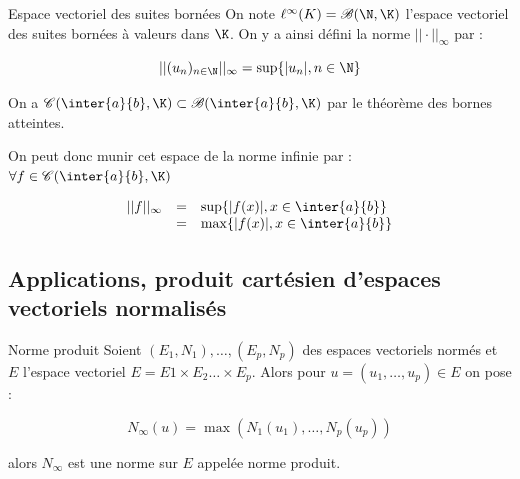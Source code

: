 \begin{definition}{Espace vectoriel des suites bornées}{}
    On note $\ell^\infty(K) = \mathscr B(\N, \K)$ l'espace vectoriel des suites bornées
    à valeurs dans $\K$. On y a ainsi défini la norme $|| \cdot ||_\infty$ par :

    $$||(u_n)_{n \in \N} ||_\infty = \sup\{|u_n|, n \in \N\}$$
\end{definition}

\begin{definition}{}{}
    On a $\mathscr C(\inter{a}{b}, \K) \subset \mathscr B(\inter{a}{b}, \K)$
    par le théorème des bornes atteintes. 

    On peut donc munir cet espace de la norme infinie par : 
    $\forall f \in \mathscr C(\inter{a}{b}, \K)$

    \[
    \begin{array}{rcl}
        ||f ||_\infty & =& \sup\{|f(x)|, x \in \inter{a}{b}\} \\
        \space & = & \max\{|f(x)|, x \in \inter{a}{b}\} \\
    \end{array}
    \]


\end{definition}


\subsection{Applications, produit cartésien d'espaces vectoriels normalisés}

\begin{theoreme}{Norme produit}{}
    Soient $(E_1, N_1), \dots, (E_p, N_p)$ des espaces vectoriels normés
    et $E$ l'espace vectoriel $E = E1 \times E_2 \dots \times E_p$.
    Alors pour $u = (u_1, \dots, u_p) \in E$ on pose :

    $$N_\infty(u) = \max(N_1(u_1), \dots, N_p(u_p))$$

    alors $N_\infty$ est une norme sur $E$ appelée norme produit. 
\end{theoreme}

